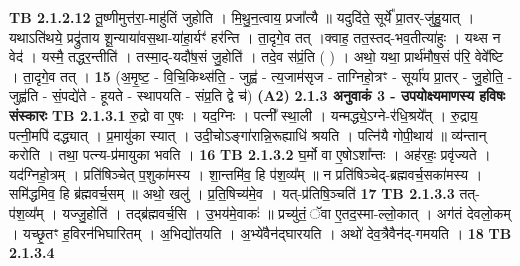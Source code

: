 \documentclass[17pt]{extarticle}
\begin{document}
                                \textbf{ TB 2.1.2.12} \newline
                  तू॒ष्णीमुत्त॑रा॒-माहु॑तिं जुहोति । मि॒थु॒न॒त्वाय॒ प्रजा᳚त्यै ॥ यदुदि॑ते॒ सूर्ये᳚ प्रा॒तर्-जु॑हु॒यात् । यथाऽति॑थये॒ प्रद्रु॑ताय शू॒न्याया॑वस॒था-या॑हा॒र्यꣳ॑ हर॑न्ति । ता॒दृगे॒व तत् ।क्वाह॒ तत॒स्तद्-भव॒तीत्या॑हुः । यथ्स न वेद॑ । यस्मै॒ तद्धर॒न्तीति॑ । तस्मा॒द्-यदौ॑ष॒सं जु॒होति॑ । तदे॒व स॑प्रं॒ति ( ) । अथो॒ यथा॒ प्रार्थ॑मौष॒सं प॑रि॒ वेवे᳚ष्टि । ता॒दृगे॒व तत् । \textbf{ 15} \newline
                  \newline
                                    (अ॒मृ॒ष्ट॒ - वि॒चि॒किथ्स॑ति॒ - जुह्व॑ - त्य॒जाम॑सृज - ताग्निहो॒त्रꣳ - सूर्या॑य प्रा॒तर् - जु॒होति॒ - जुह्व॑ति - सं॒पद्ये॑ते - हूयते - स्थापयति - संप्र॒ति द्वे च॑) \textbf{(A2)} \newline \newline
                \textbf{ 2.1.3      अनुवाकं   3 - उपयोक्ष्यमाणस्य हविषः संस्कारः} \newline
                                \textbf{ TB 2.1.3.1} \newline
                  रु॒द्रो वा ए॒षः । यद॒ग्निः । पत्नी᳚ स्था॒ली । यन्मद्ध्ये॒ऽग्ने-र॑धि॒श्रये᳚त् । रु॒द्राय॒ पत्नी॒मपि॑ दद्ध्यात् । प्र॒मायु॑का स्यात् । उदी॒चोऽङ्गा॑रान्नि॒रूह्याधि॑ श्रयति । पत्नि॑यै गोपी॒थाय॑ ॥ व्य॑न्तान् करोति । तथा॒ पत्न्य-प्र॑मायुका भवति । \textbf{ 16} \newline
                  \newline
                                \textbf{ TB 2.1.3.2} \newline
                  घ॒र्मो वा ए॒षोऽशा᳚न्तः । अह॑रहः॒ प्रवृ॑ज्यते । यद॑ग्निहो॒त्रम् । प्रति॑षिञ्चेत् प॒शुका॑मस्य । शा॒न्तमि॑व॒ हि प॑श॒व्य᳚म् ॥ न प्रति॑षिञ्चेद्-ब्रह्मवर्च॒सका॑मस्य । समि॑द्धमिव॒ हि ब्र॑ह्मवर्च॒सम् ॥ अथो॒ खलु॑ । प्र॒ति॒षिच्य॑मे॒व । यत्-प्र॑तिषि॒ञ्चति॑ \textbf{ 17} \newline
                  \newline
                                \textbf{ TB 2.1.3.3} \newline
                  तत्-प॑श॒व्य᳚म् । यज्जु॒होति॑ । तद्ब्र॑ह्मवर्च॒सि । उ॒भय॑मे॒वाकः॑ ॥ प्रच्यु॑तं॒ ॅवा ए॒तद॒स्मा-ल्लो॒कात् । अग॑तं देवलो॒कम् । यच्छृ॒तꣳ ह॒विरन॑भिघारितम् । अ॒भिद्यो॑तयति । अ॒भ्ये॑वैन॑द्घारयति । अथो॑ देव॒त्रैवैन॑द्-गमयति । \textbf{ 18} \newline
                  \newline
                                \textbf{ TB 2.1.3.4} \newline
\end{document}
